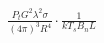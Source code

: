 \documentclass[preview]{standalone}
\begin{document}
\begin{align*}
\frac{P_t G^2 \lambda^2 \sigma}{(4 \pi)^3 R^4} \cdot \frac{1}{k T_s B_n L}
\end{align*}
\end{document}
